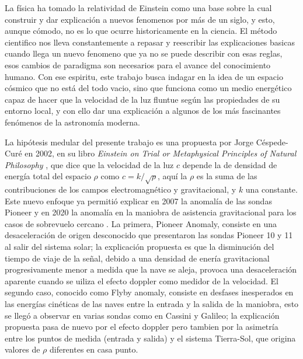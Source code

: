 La física ha tomado la relatividad de Einstein como una base sobre la cual construir y dar explicación a nuevos fenomenos por más de un siglo, y esto, aunque cómodo, no es lo que ocurre historicamente en la ciencia. El método cientifico nos lleva constantemente a repasar y reescribir las explicaciones basicas cuando llega un nuevo fenomeno que ya no se puede describir con esas reglas, esos cambios de paradigma son necesarios para el avance del conocimiento humano. Con ese espiritu, este trabajo busca indagar en la idea de un espacio cósmico que no está del todo vacio, sino que funciona como un medio energético capaz de hacer que la velocidad de la luz fluntue según las propiedades de su entorno local, y con ello dar una explicación a algunos de los más fascinantes fenómenos de la astronomía moderna.
 

La hipótesis medular del presente trabajo es una propuesta por Jorge Céspede-Curé en 2002, en su libro \textit{Einstein on Trial or Metaphysical Principles of Natural Philosophy} \cite{bib:el-libro}, que dice que la velocidad de la luz $c$ depende la de densidad de energía total del espacio $\rho$ como  $c = k / \sqrt{\rho}$, aquí la $\rho$ es la suma de las contribuciones de los campos electromagnético y gravitacional, y $k$ una constante. Este nuevo enfoque ya permitió explicar en 2007 la anomalía de las sondas Pioneer \cite{Cisnotconstant} y en 2020 la anomalía en la maniobra de asistencia gravitacional para los casos de sobrevuelo cercano \cite{Greavesflyby}. La primera, Pioneer Anomaly, consiste en una desaceleración de origen desconocido que presentaron las sondas Pioneer 10 y 11 al salir del sistema solar; la explicación propuesta es que la disminución del tiempo de viaje de la señal, debido a una densidad de enería gravitacional progresivamente menor a medida que la nave se aleja, provoca una desaceleración aparente cuando se uiliza el efecto doppler como medidor de la velocidad. El segundo caso, conocido como Flyby anomaly, consiste en desfases inesperados en las energías cinéticas de las naves entre la entrada y la salida de la maniobra, esto se llegó a observar en varias sondas como en Cassini y Galileo; la explicación propuesta pasa de nuevo por el efecto doppler pero tambien por la asimetría entre los puntos de medida (entrada y salida) y el sistema Tierra-Sol, que origina valores de $\rho$ diferentes en casa punto. 



